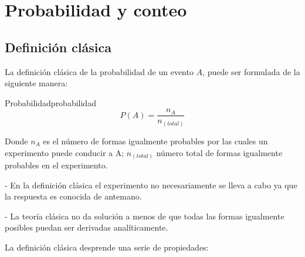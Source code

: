 \section{Probabilidad y conteo}

\subsection{Definici\'on cl\'asica}

La definici\'on cl\'asica de la probabilidad \cite{faber2012statistics} de un
evento $A$, puede ser formulada de la siguiente manera:

\begin{theorem}{Probabilidad}{probabilidad}
    \begin{equation}
        P(A)= \frac{n_A}{n_(total)}
    \end{equation}
    \label{eq:probabilidad}
\end{theorem}

Donde $n_A$ es el n\'umero de formas igualmente probables por las cuales un
experimento puede conducir a A; $n_(total)$ n\'umero total de formas igualmente
probables en el experimento.

- En la definici\'on cl\'asica el experimento no necesariamente se lleva a cabo
ya que la respuesta es conocida de antemano.

- La teor\'ia cl\'asica no da soluci\'on a menos de que todas las formas
igualmente posibles puedan ser derivadas anal\'iticamente.

La definición clásica desprende una serie de propiedades:

